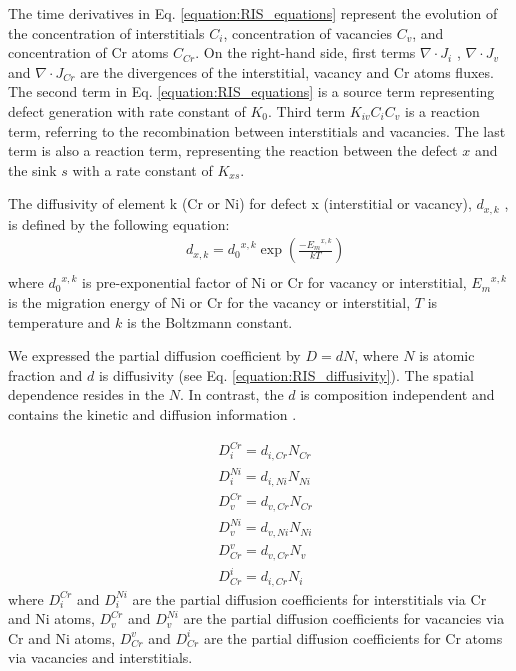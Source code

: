 \documentclass[utf8]{frontiersSCNS} %
\begin{document}
The time derivatives in Eq. \ref{equation:RIS_equations} represent the evolution of the concentration of interstitials ${C_i}$,  concentration of vacancies ${C_v}$,  and concentration of Cr atoms ${C_{Cr}}$. On the right-hand side, first terms ${\nabla\cdot J_i}$ , ${\nabla\cdot J_v}$ and ${\nabla\cdot J_{Cr}}$ are the divergences of the interstitial, vacancy and Cr atoms fluxes. The second term in Eq. \ref{equation:RIS_equations} is a source term representing defect generation with rate constant of $K_0$. Third term ${K_{iv}C_iC_v}$ is a reaction term, referring to the recombination between interstitials and vacancies. The last term is also a reaction term, representing the reaction between the defect $x$ and the sink $s$ with a rate constant of ${K_{xs}}$. 

The diffusivity of element k (Cr or Ni) for defect x (interstitial or vacancy), \textit{$d_{x,k}$} , is defined by the following equation:
\begin{equation}
    \begin{aligned}
    &d_{x,k} = {d_0}^{x,k}\exp(\frac{-{E_m}^{x,k}}{kT})\\
    \end{aligned}
    \label{equation:RIS_diffusivity}
\end{equation}
where ${d_0}^{x,k}$ is pre-exponential factor of Ni or Cr for vacancy or interstitial, ${{E_m}^{x,k}}$ is the migration energy of Ni or Cr for the vacancy or interstitial, $T$ is temperature and $k$ is the Boltzmann constant.

We expressed the partial diffusion coefficient by $D = dN$, where $N$ is atomic fraction and $d$ is diffusivity (see Eq. \ref{equation:RIS_diffusivity}). The spatial dependence resides in the $N$. In contrast, the $d$ is composition independent and contains the kinetic and diffusion information \citep{wiedersich_theory_1979}.

\begin{equation}\begin{aligned}
        &D_{i}^{Cr} = d_{i,Cr}N_{Cr}\\
        &D_{i}^{Ni} = d_{i,Ni}N_{Ni}\\
        &D_{v}^{Cr} = d_{v,Cr}N_{Cr}\\
        &D_{v}^{Ni} = d_{v,Ni}N_{Ni}\\
        &D_{Cr}^{v} = d_{v,Cr}N_{v}\\
        &D_{Cr}^{i} = d_{i,Cr}N_{i}
        \label{equation:RIS_partial}
        \end{aligned}
     \end{equation}
where $D_{i}^{Cr}$ and $D_{i}^{Ni}$ are the partial diffusion coefficients for interstitials via Cr and Ni atoms,  $D_{v}^{Cr}$ and $D_{v}^{Ni}$ are the partial diffusion coefficients for vacancies via Cr and Ni atoms, $D_{Cr}^{v}$ and $D_{Cr}^{i}$ are the partial diffusion coefficients for Cr atoms via vacancies and interstitials. 
\end{document}

